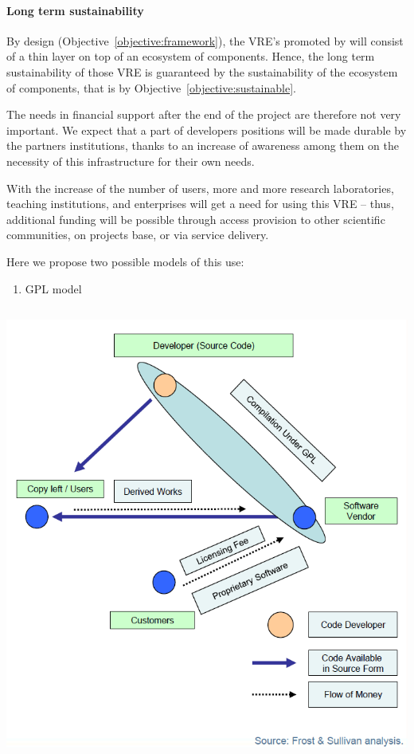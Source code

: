 \paragraph{Long term sustainability}

By design (Objective~\ref{objective:framework}), the VRE's promoted by
\TheProject will consist of a thin layer on top of an ecosystem of
components. Hence, the long term sustainability of those VRE is
guaranteed by the sustainability of the ecosystem of components, that
is by Objective~\ref{objective:sustainable}.

The needs in financial support after the end of the project are
therefore not very
important. We expect that a part of developers positions will be made
durable by the partners institutions, thanks to an increase of
awareness among them on the necessity of this infrastructure for their
own needs.

With the increase of the number of users, more and more research
laboratories, teaching institutions, and enterprises will get a need
for using this VRE – thus, additional funding will be possible through
access provision to other scientific communities, on projects base, or
via service delivery.


Here we propose two possible models of this use:

\begin{enumerate}
\item GPL model
\end{enumerate}
 \includegraphics[width=16.746cm,height=14.998cm]{Impact-img1.png}

